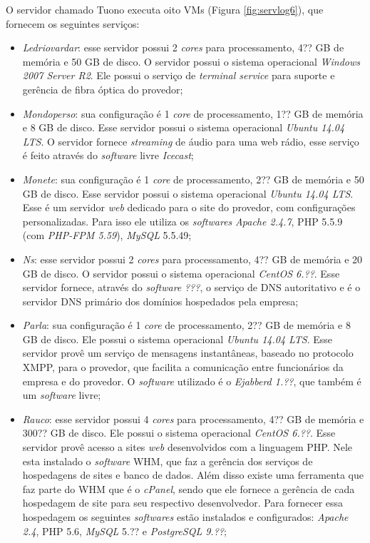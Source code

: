 O servidor chamado Tuono executa oito \ac{VM}s (Figura \ref{fig:servlog6}), que fornecem os seguintes serviços:
\begin{itemize}
 \item \textit{Ledriovardar}: esse servidor possui 2 \textit{cores} para processamento, 4?? GB de memória e 50 GB de disco. O servidor possui 
 o sistema operacional \textit{Windows 2007 Server R2}. Ele possui o serviço de \textit{terminal service} para suporte e gerência de fibra 
 óptica do provedor;
 
 \item \textit{Mondoperso}: sua configuração é 1 \textit{core} de processamento, 1?? GB de memória e 8 GB de disco. Esse servidor possui o 
 sistema operacional \textit{Ubuntu 14.04 \ac{LTS}}. O servidor fornece \textit{streaming} de áudio para uma web rádio, esse serviço é feito
 através do \textit{software} livre \textit{Icecast};
 
 \item \textit{Monete}: sua configuração é 1 \textit{core} de processamento, 2?? GB de memória e 50 GB de disco. Esse servidor possui o 
 sistema operacional \textit{Ubuntu 14.04 \ac{LTS}}. Esse é um servidor \textit{web} dedicado para o site do provedor, com configurações
 personalizadas. Para isso ele utiliza os \textit{softwares} \textit{Apache 2.4.7}, \ac{PHP} 5.5.9 (com \textit{PHP-FPM 5.59}), 
 \textit{MySQL} 5.5.49;
 
 \item \textit{Ns}: esse servidor possui 2 \textit{cores} para processamento, 4?? GB de memória e 20 GB de disco. O servidor possui 
 o sistema operacional \textit{CentOS 6.??}. Esse servidor fornece, através do \textit{software} \textit{???}, o serviço de \ac{DNS} autoritativo 
 e é o servidor \ac{DNS} primário dos domínios hospedados pela empresa;
 
 \item \textit{Parla}: sua configuração é 1 \textit{core} de processamento, 2?? GB de memória e 8 GB de disco. Ele possui o sistema
 operacional \textit{Ubuntu 14.04 \ac{LTS}}. Esse servidor provê um serviço de mensagens instantâneas, baseado no protocolo \ac{XMPP}, para
 o provedor, que facilita a comunicação entre funcionários da empresa e do provedor. O \textit{software} utilizado é o \textit{Ejabberd 1.??},
 que também é um \textit{software} livre;
 
 \item \textit{Rauco}: esse servidor possui 4 \textit{cores} para processamento, 4?? GB de memória e 300?? GB de disco. Ele possui o sistema
 operacional \textit{CentOS 6.??}. Esse servidor provê acesso a sites \textit{web} desenvolvidos com a linguagem \ac{PHP}. Nele esta instalado o 
 \textit{software} \ac{WHM}, que faz a gerência dos serviços de hospedagens de sites e banco de dados. Além disso existe uma ferramenta que 
 faz parte do \ac{WHM} que é o \textit{cPanel}, sendo que ele fornece a gerência de cada hospedagem de site para seu respectivo desenvolvedor.
 Para fornecer essa hospedagem os seguintes \textit{softwares} estão instalados e configurados: \textit{Apache 2.4}, \ac{PHP} 5.6, 
 \textit{MySQL} 5.?? e \textit{PostgreSQL 9.??};
 

\end{itemize}
